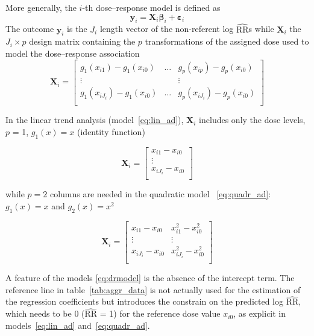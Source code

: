 \documentclass[11pt,a4paper,twoside,openany]{book}\usepackage{knitr}
\begin{document}
{\noindent More generally, the $i$-th dose--response model is defined as
\begin{equation}
\mathbf{y}_i = \mathbf{X}_i \boldsymbol{\beta}_i + \boldsymbol{\varepsilon}_i
\label{eq:drmodel}
\end{equation}
The outcome $\mathbf{y}_i$ is the $J_i$ length vector of the non-referent log $\widehat{\mathrm{RR}}$s while $\mathbf{X}_i$ the $J_i \times p$ design matrix containing the $p$ transformations of the assigned dose used to model the dose--response association
\begin{equation}
 \mathbf{X}_i=\left[
\begin{array}{ccc}
g_{1}(x_{i1}) - g_{1}(x_{i0}) & \hdots & g_{p}(x_{ip}) - g_{p}(x_{i0}) \\
\vdots &  & \vdots \\
g_{1}(x_{iJ_i}) -  g_{1}(x_{i0}) & \hdots & g_{p}(x_{iJ_i}) -  g_{p}(x_{i0}) \\
\end{array}%
\right] 
\label{eq:des.matrix}
\end{equation}

\noindent In the linear trend analysis (model~\ref{eq:lin_ad}), $\mathbf{X}_i$ includes only the dose levels, $p$ = 1, $g_1(x) = x$ (identity function)

\begin{equation*}
 \mathbf{X}_i=\left[
\begin{array}{c}
x_{i1} - x_{i0} \\
\vdots \\
x_{iJ_i} - x_{i0} \\
\end{array}%
\right] 
\end{equation*}

\noindent while $p = 2$ columns are needed in the quadratic model ~\ref{eq:quadr_ad}: $g_1(x) = x$ and $g_2(x) = x^2$

\begin{equation*}
 \mathbf{X}_i=\left[
\begin{array}{cc}
x_{i1} - x_{i0} & x_{i1}^2 - x_{i0}^2 \\
\vdots & \vdots \\
x_{iJ_i} - x_{i0} & x_{iJ_i}^2 - x_{i0}^2 \\
\end{array}%
\right] 
\end{equation*}

\noindent A feature of the models \ref{eq:drmodel} is the absence of the intercept term. The reference line in table~\ref{tab:aggr_data} is not actually used for the estimation of the regression coefficients but introduces the constrain on the predicted log $\widehat{\mathrm{RR}}$, which needs to be 0 ($\widehat{\mathrm{RR}}$ = 1) for the reference dose value $x_{i0}$, as explicit in models~\ref{eq:lin_ad} and~\ref{eq:quadr_ad}.

}
\end{document}
